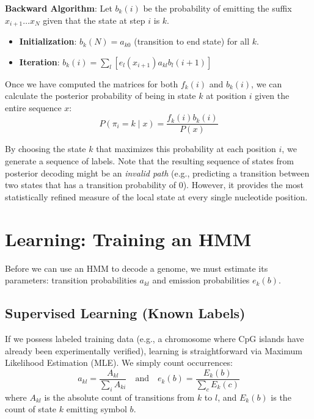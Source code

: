 \begin{important}
\textbf{Backward Algorithm}: Let $b_k(i)$ be the probability of emitting the suffix $x_{i+1} \dots x_N$ given that the state at step $i$ is $k$.
\begin{itemize}
    \item \textbf{Initialization}: $b_k(N) = a_{k0}$ (transition to end state) for all $k$.
    \item \textbf{Iteration}: $b_k(i) = \sum_l \left[ e_l(x_{i+1}) a_{kl} b_l(i+1) \right]$
\end{itemize}
\end{important}

Once we have computed the matrices for both $f_k(i)$ and $b_k(i)$, we can calculate the posterior probability of being in state $k$ at position $i$ given the entire sequence $x$:
\begin{equation}
P(\pi_i = k \mid x) = \frac{f_k(i) b_k(i)}{P(x)}
\end{equation}

By choosing the state $k$ that maximizes this probability at each position $i$, we generate a sequence of labels. 
\sta Note that the resulting sequence of states from posterior decoding might be an \textit{invalid path} (e.g., predicting a transition between two states that has a transition probability of 0). However, it provides the most statistically refined measure of the local state at every single nucleotide position.

\section{Learning: Training an HMM}

Before we can use an HMM to decode a genome, we must estimate its parameters: transition probabilities $a_{kl}$ and emission probabilities $e_k(b)$.

\subsection{Supervised Learning (Known Labels)}
If we possess labeled training data (e.g., a chromosome where CpG islands have already been experimentally verified), learning is straightforward via Maximum Likelihood Estimation (MLE). We simply count occurrences:
\[ a_{kl} = \frac{A_{kl}}{\sum_i A_{ki}} \quad \text{and} \quad e_k(b) = \frac{E_k(b)}{\sum_c E_k(c)} \]
where $A_{kl}$ is the absolute count of transitions from $k$ to $l$, and $E_k(b)$ is the count of state $k$ emitting symbol $b$.

